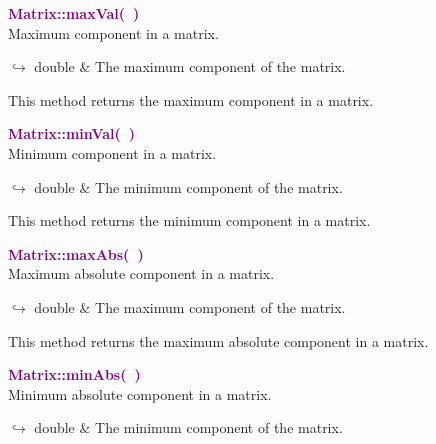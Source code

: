 \textcolor{purple}{\textbf{Matrix::maxVal(~)}}\label{Matrix::maxVal()}\\
Maximum component in a matrix.\vspace*{-0.5em}
\begin{tcolorbox}[grow to left by=-1cm, width=\textwidth-1cm,myArgs,tabularx={l|R}]
$\hookrightarrow$ double & The maximum component of the matrix.
\end{tcolorbox}

This method returns the maximum component in a matrix.

\textcolor{purple}{\textbf{Matrix::minVal(~)}}\label{Matrix::minVal()}\\
Minimum component in a matrix.\vspace*{-0.5em}
\begin{tcolorbox}[grow to left by=-1cm, width=\textwidth-1cm,myArgs,tabularx={l|R}]
$\hookrightarrow$ double & The minimum component of the matrix.
\end{tcolorbox}

This method returns the minimum component in a matrix.

\textcolor{purple}{\textbf{Matrix::maxAbs(~)}}\label{Matrix::maxAbs()}\\
Maximum absolute component in a matrix.\vspace*{-0.5em}
\begin{tcolorbox}[grow to left by=-1cm, width=\textwidth-1cm,myArgs,tabularx={l|R}]
$\hookrightarrow$ double & The maximum component of the matrix.
\end{tcolorbox}

This method returns the maximum absolute component in a matrix.

\textcolor{purple}{\textbf{Matrix::minAbs(~)}}\label{Matrix::minAbs()}\\
Minimum absolute component in a matrix.\vspace*{-0.5em}
\begin{tcolorbox}[grow to left by=-1cm, width=\textwidth-1cm,myArgs,tabularx={l|R}]
$\hookrightarrow$ double & The minimum component of the matrix.
\end{tcolorbox}


